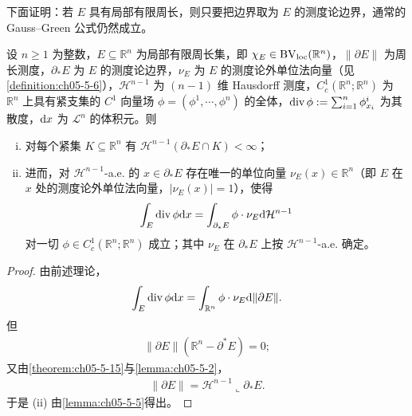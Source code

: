 \documentclass[../../main.tex]{subfiles}%
\begin{document}
下面证明：若 $E$ 具有局部有限周长，则只要把边界取为 $E$ 的测度论边界，通常的 Gauss--Green 公式仍然成立。

\begin{theorem}\label{theorem:ch05-5-16}
设 $n\geqslant1$ 为整数，$E\subseteq\mathbb{R}^n$ 为局部有限周长集，即 $\chi_E\in\mathrm{BV}_{\mathrm{loc}}(\mathbb{R}^n)$，$\lVert\partial E\rVert$ 为周长测度，$\partial_*E$ 为 $E$ 的测度论边界，$\nu_E$ 为 $E$ 的测度论外单位法向量（见\cref{definition:ch05-5-6}），$\mathcal{H}^{n-1}$ 为 $(n-1)$ 维 Hausdorff 测度，$C_c^1(\mathbb{R}^n;\mathbb{R}^n)$ 为 $\mathbb{R}^n$ 上具有紧支集的 $C^1$ 向量场 $\phi=(\phi^1,\cdots,\phi^n)$ 的全体，$\operatorname{div}\phi:=\sum_{i=1}^{n}\phi^i_{x_i}$ 为其散度，$\mathrm{d} x$ 为 $\mathcal{L}^n$ 的体积元。则%
\begin{enumerate}[(i)]
\item 对每个紧集 $K\subseteq\mathbb{R}^n$ 有 $\mathcal{H}^{n-1}(\partial_*E\cap K)<\infty$；
\item 进而，对 $\mathcal{H}^{n-1}$-a.e. 的 $x\in\partial_*E$ 存在唯一的单位向量 $\nu_E(x)\in\mathbb{R}^n$（即 $E$ 在 $x$ 处的测度论外单位法向量，$\lvert\nu_E(x)\rvert=1$），使得
\begin{align*}
\int_E\operatorname{div}\phi\mathrm{d} x=\int_{\partial_*E}\phi\cdot\nu_E\mathrm{d}\mathcal{H}^{n-1}
\end{align*}
对一切 $\phi\in C_c^1(\mathbb{R}^n;\mathbb{R}^n)$ 成立；其中 $\nu_E$ 在 $\partial_*E$ 上按 $\mathcal{H}^{n-1}$-a.e. 确定。
\end{enumerate}
\end{theorem}

\begin{proof}
由前述理论，
\begin{align*}
\int_E\operatorname{div}\phi\mathrm{d} x=\int_{\mathbb{R}^n}\phi\cdot\nu_E\mathrm{d}\lVert\partial E\rVert .
\end{align*}
但
\begin{align*}
\lVert\partial E\rVert(\mathbb{R}^n-\partial^*E)=0 ;
\end{align*}
又由\cref{theorem:ch05-5-15}与\cref{lemma:ch05-5-2}，%
\begin{align*}
\lVert\partial E\rVert=\mathcal{H}^{n-1}\llcorner\partial_*E .
\end{align*}
于是 (ii) 由\cref{lemma:ch05-5-5}得出。%
\end{proof}
\end{document}
